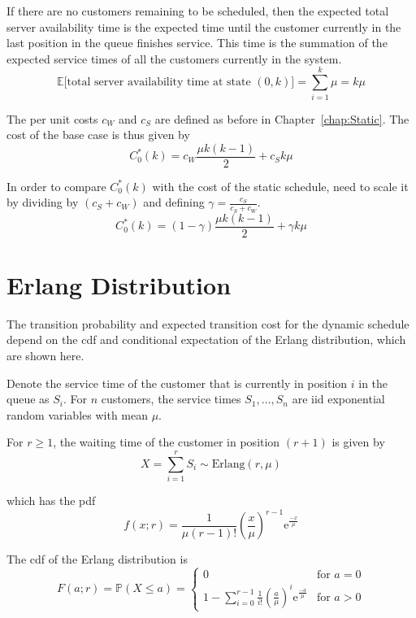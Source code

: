 If there are no customers remaining to be scheduled, then the expected total server availability time is the expected time until the customer currently in the last position in the queue finishes service. This time is the summation of the expected service times of all the customers currently in the system.
\begin{equation}
	\mathbb{E} \Big[\text{total server availability time at state $(0, k)$} \Big] = \sum_{i = 1}^{k} \mu = k \mu
\end{equation}

The per unit costs $c_{W}$ and $c_{S}$ are defined as before in Chapter~\ref{chap:Static}. The cost of the base case is thus given by
\begin{equation}
 	C_{0}^{*} (k) = c_{W} \frac{\mu k (k - 1)}{2} + c_{S} k \mu
\end{equation}

In order to compare $C_{0}^{*} (k)$ with the cost of the static schedule, need to scale it by dividing by $(c_{S} + c_{W})$ and defining $\gamma = \frac{c_{S}}{c_{S} + c_{W}}$.
\begin{equation}
	C_{0}^{*} (k) = (1 - \gamma) \frac{\mu k (k - 1)}{2} + \gamma k \mu
\end{equation}

\section{Erlang Distribution}
The transition probability and expected transition cost for the dynamic schedule depend on the cdf and conditional expectation of the Erlang distribution, which are shown here.

Denote the service time of the customer that is currently in position $i$ in the queue as $S_{i}$. For $n$ customers, the service times $S_{1}, \ldots, S_{n}$ are iid exponential random variables with mean $\mu$.

For $r \geq 1$, the waiting time of the customer in position $(r + 1)$ is given by
\begin{equation}
	X = \sum_{i = 1}^{r} S_{i} \sim \text{Erlang}(r, \mu)
\end{equation}

which has the pdf
\begin{equation}
	f (x; r) = \frac{1}{\mu (r - 1)!} \left( \frac{x}{\mu} \right)^{r - 1} \mathrm{e}^{\frac{-x}{\mu}}
\end{equation}

The cdf of the Erlang distribution is
\begin{equation}
	F (a; r) = \mathbb{P} (X \leq a) = \begin{cases} 0 & \text{for $a = 0$} \\ 1 - \sum_{i = 0}^{r - 1} \frac{1}{i!} \left( \frac{a}{\mu} \right)^{i} \mathrm{e}^{\frac{-a}{\mu}} & \text{for $a > 0$} \end{cases}
\end{equation}


